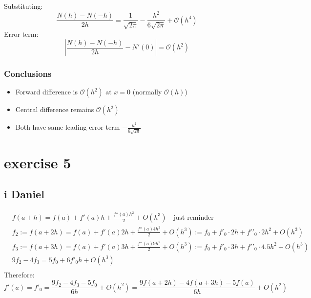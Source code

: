 \documentclass{article}
\begin{document}
Substituting:
\[
    \frac{N(h)-N(-h)}{2h} = \frac{1}{\sqrt{2\pi}} - \frac{h^2}{6\sqrt{2\pi}} + \mathcal{O}(h^4)
\]
Error term:
\[
    \left|\frac{N(h)-N(-h)}{2h}-N'(0)\right| = \mathcal{O}(h^2)
\]

\subsubsection*{Conclusions}
\begin{itemize}
    \item Forward difference is $\mathcal{O}(h^2)$ at $x=0$ (normally $\mathcal{O}(h)$)
    \item Central difference remains $\mathcal{O}(h^2)$
    \item Both have same leading error term $-\frac{h^2}{6\sqrt{2\pi}}$
\end{itemize}


\section{exercise 5}
\subsection{i Daniel}
\begin{align}
     & f\left( a+h \right) = f\left( a \right)+f'\left( a \right)h+\frac{f''\left( a \right){{h}^{2}}}{2}+O\left( {{h}^{3}} \right)\quad \text{just reminder}                                                                           \\
     & {{f}_{2}}:=f\left( a+2h \right) = f\left( a \right)+f'\left( a \right)2h+\frac{f''\left( a \right)4{{h}^{2}}}{2}+O\left( {{h}^{3}} \right):={{f}_{0}}+f{{'}_{0}}\cdot 2h+f'{{'}_{0}}\cdot 2{{h}^{2}}+O\left( {{h}^{3}} \right)   \\
     & {{f}_{3}}:=f\left( a+3h \right) = f\left( a \right)+f'\left( a \right)3h+\frac{f''\left( a \right)9{{h}^{2}}}{2}+O\left( {{h}^{3}} \right):={{f}_{0}}+f{{'}_{0}}\cdot 3h+f'{{'}_{0}}\cdot 4.5{{h}^{2}}+O\left( {{h}^{3}} \right) \\
     & 9{{f}_{2}}-4{{f}_{3}}=5{{f}_{0}}+6f{{'}_{0}}h+O\left( {{h}^{3}} \right)                                                                                                                                                          \\
\end{align}
Therefore:
\[f'\left( a \right)=f{{'}_{0}}=\frac{9{{f}_{2}}-4{{f}_{3}}-5{{f}_{0}}}{6h}+O\left( {{h}^{2}} \right)=\frac{9f\left( a+2h \right)-4f\left( a+3h \right)-5f\left( a \right)}{6h}+O\left( {{h}^{2}} \right)\]
\end{document}
